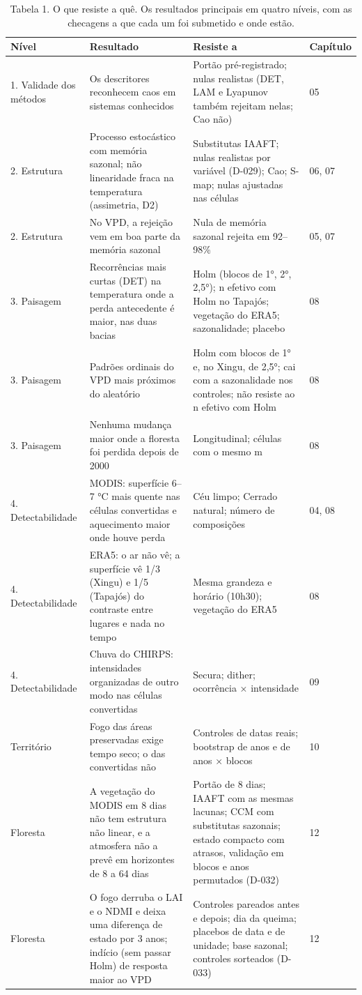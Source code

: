 \begin{table}
\caption{Tabela 1. O que resiste a quê. Os resultados principais em quatro níveis, com as checagens a que cada um foi submetido e onde estão.}
\label{tab:00_inicio::sintese}
\begin{tabular}{llll}
\toprule
Nível & Resultado & Resiste a & Capítulo \\
\midrule
1. Validade dos métodos & Os descritores reconhecem caos em sistemas conhecidos & Portão pré-registrado; nulas realistas (DET, LAM e Lyapunov também rejeitam nelas; Cao não) & 05 \\
2. Estrutura & Processo estocástico com memória sazonal; não linearidade fraca na temperatura (assimetria, D2) & Substitutas IAAFT; nulas realistas por variável (D-029); Cao; S-map; nulas ajustadas nas células & 06, 07 \\
2. Estrutura & No VPD, a rejeição vem em boa parte da memória sazonal & Nula de memória sazonal rejeita em 92–98\% & 05, 07 \\
3. Paisagem & Recorrências mais curtas (DET) na temperatura onde a perda antecedente é maior, nas duas bacias & Holm (blocos de 1°, 2°, 2,5°); n efetivo com Holm no Tapajós; vegetação do ERA5; sazonalidade; placebo & 08 \\
3. Paisagem & Padrões ordinais do VPD mais próximos do aleatório & Holm com blocos de 1° e, no Xingu, de 2,5°; cai com a sazonalidade nos controles; não resiste ao n efetivo com Holm & 08 \\
3. Paisagem & Nenhuma mudança maior onde a floresta foi perdida depois de 2000 & Longitudinal; células com o mesmo m & 08 \\
4. Detectabilidade & MODIS: superfície 6–7 °C mais quente nas células convertidas e aquecimento maior onde houve perda & Céu limpo; Cerrado natural; número de composições & 04, 08 \\
4. Detectabilidade & ERA5: o ar não vê; a superfície vê 1/3 (Xingu) e 1/5 (Tapajós) do contraste entre lugares e nada no tempo & Mesma grandeza e horário (10h30); vegetação do ERA5 & 08 \\
4. Detectabilidade & Chuva do CHIRPS: intensidades organizadas de outro modo nas células convertidas & Secura; dither; ocorrência × intensidade & 09 \\
Território & Fogo das áreas preservadas exige tempo seco; o das convertidas não & Controles de datas reais; bootstrap de anos e de anos × blocos & 10 \\
Floresta & A vegetação do MODIS em 8 dias não tem estrutura não linear, e a atmosfera não a prevê em horizontes de 8 a 64 dias & Portão de 8 dias; IAAFT com as mesmas lacunas; CCM com substitutas sazonais; estado compacto com atrasos, validação em blocos e anos permutados (D-032) & 12 \\
Floresta & O fogo derruba o LAI e o NDMI e deixa uma diferença de estado por 3 anos; indício (sem passar Holm) de resposta maior ao VPD & Controles pareados antes e depois; dia da queima; placebos de data e de unidade; base sazonal; controles sorteados (D-033) & 12 \\
\bottomrule
\end{tabular}
\end{table}
